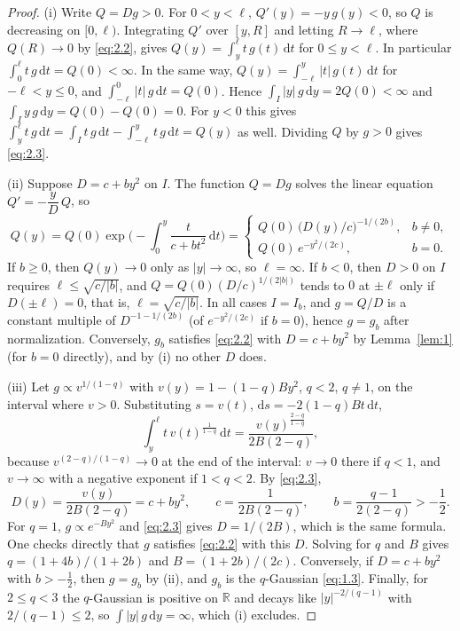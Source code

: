 \documentclass[aip,jmp,preprint,onecolumn,floatfix,superscriptaddress,nofootinbib,11pt]{revtex4-2}
\theoremstyle{plain}
\theoremstyle{remark}
\numberwithin{equation}{section}
\newcommand{\dd}{\mathrm{d}}
\begin{document}
\begin{proof}
(i) Write $Q=Dg>0$. For $0<y<\ell$, $Q'(y)=-y\,g(y)<0$, so $Q$ is decreasing on $[0,\ell)$. Integrating $Q'$ over $[y,R]$ and letting $R\to \ell$, where $Q(R)\to0$ by \eqref{eq:2.2}, gives $Q(y)=\int_y^{\ell}t\,g(t)\,\dd t$ for $0\le y<\ell$. In particular $\int_0^{\ell}t\,g\,\dd t=Q(0)<\infty$. In the same way, $Q(y)=\int_{-\ell}^{y}|t|\,g(t)\,\dd t$ for $-\ell<y\le0$, and $\int_{-\ell}^{0}|t|\,g\,\dd t=Q(0)$. Hence $\int_I|y|\,g\,\dd y=2Q(0)<\infty$ and $\int_I y\,g\,\dd y=Q(0)-Q(0)=0$. For $y<0$ this gives $\int_y^{\ell}t\,g\,\dd t=\int_I t\,g\,\dd t-\int_{-\ell}^{y}t\,g\,\dd t=Q(y)$ as well. Dividing $Q$ by $g>0$ gives \eqref{eq:2.3}.

(ii) Suppose $D=c+by^{2}$ on $I$. The function $Q=Dg$ solves the linear equation $Q'=-\dfrac{y}{D}\,Q$, so
\begin{equation*}
Q(y)=Q(0)\exp\Big(-\int_0^{y}\frac{t}{c+bt^{2}}\,\dd t\Big)=
\begin{cases} Q(0)\,\big(D(y)/c\big)^{-1/(2b)}, & b\ne0,\\[2pt] Q(0)\,e^{-y^{2}/(2c)}, & b=0.\end{cases}
\end{equation*}
If $b\ge0$, then $Q(y)\to0$ only as $|y|\to\infty$, so $\ell=\infty$. If $b<0$, then $D>0$ on $I$ requires $\ell\le\sqrt{c/|b|}$, and $Q=Q(0)(D/c)^{1/(2|b|)}$ tends to $0$ at $\pm \ell$ only if $D(\pm \ell)=0$, that is, $\ell=\sqrt{c/|b|}$. In all cases $I=I_b$, and $g=Q/D$ is a constant multiple of $D^{-1-1/(2b)}$ (of $e^{-y^{2}/(2c)}$ if $b=0$), hence $g=g_b$ after normalization. Conversely, $g_b$ satisfies \eqref{eq:2.2} with $D=c+by^{2}$ by Lemma~\ref{lem:1} (for $b=0$ directly), and by (i) no other $D$ does.

(iii) Let $g\propto v^{1/(1-q)}$ with $v(y)=1-(1-q)By^{2}$, $q<2$, $q\ne1$, on the interval where $v>0$. Substituting $s=v(t)$, $\dd s=-2(1-q)Bt\,\dd t$,
\begin{equation*}
\int_y^{\ell}t\,v(t)^{\frac{1}{1-q}}\,\dd t=\frac{v(y)^{\frac{2-q}{1-q}}}{2B(2-q)},
\end{equation*}
because $v^{(2-q)/(1-q)}\to0$ at the end of the interval: $v\to0$ there if $q<1$, and $v\to\infty$ with a negative exponent if $1<q<2$. By \eqref{eq:2.3},
\begin{equation*}
D(y)=\frac{v(y)}{2B(2-q)}=c+by^{2},\qquad c=\frac{1}{2B(2-q)},\qquad b=\frac{q-1}{2(2-q)}>-\frac12 .
\end{equation*}
For $q=1$, $g\propto e^{-By^{2}}$ and \eqref{eq:2.3} gives $D=1/(2B)$, which is the same formula. One checks directly that $g$ satisfies \eqref{eq:2.2} with this $D$. Solving for $q$ and $B$ gives $q=(1+4b)/(1+2b)$ and $B=(1+2b)/(2c)$. Conversely, if $D=c+by^{2}$ with $b>-\tfrac12$, then $g=g_b$ by (ii), and $g_b$ is the $q$-Gaussian \eqref{eq:1.3}. Finally, for $2\le q<3$ the $q$-Gaussian is positive on $\mathbb R$ and decays like $|y|^{-2/(q-1)}$ with $2/(q-1)\le2$, so $\int|y|\,g\,\dd y=\infty$, which (i) excludes.
\end{proof}
\end{document}
